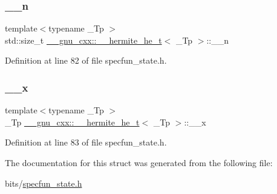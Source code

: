 \subsubsection{\texorpdfstring{\+\_\+\+\_\+n}{\_\_n}}
{\footnotesize\ttfamily template$<$typename \+\_\+\+Tp $>$ \\
std\+::size\+\_\+t \hyperlink{struct____gnu__cxx_1_1____hermite__he__t}{\+\_\+\+\_\+gnu\+\_\+cxx\+::\+\_\+\+\_\+hermite\+\_\+he\+\_\+t}$<$ \+\_\+\+Tp $>$\+::\+\_\+\+\_\+n}



Definition at line 82 of file specfun\+\_\+state.\+h.

\mbox{\label{struct____gnu__cxx_1_1____hermite__he__t_a24b66f5153ce3e231976e18b4eccb2a0}} 
\subsubsection{\texorpdfstring{\+\_\+\+\_\+x}{\_\_x}}
{\footnotesize\ttfamily template$<$typename \+\_\+\+Tp $>$ \\
\+\_\+\+Tp \hyperlink{struct____gnu__cxx_1_1____hermite__he__t}{\+\_\+\+\_\+gnu\+\_\+cxx\+::\+\_\+\+\_\+hermite\+\_\+he\+\_\+t}$<$ \+\_\+\+Tp $>$\+::\+\_\+\+\_\+x}



Definition at line 83 of file specfun\+\_\+state.\+h.



The documentation for this struct was generated from the following file\+:\begin{DoxyCompactItemize}
\item 
bits/\hyperlink{specfun__state_8h}{specfun\+\_\+state.\+h}\end{DoxyCompactItemize}
